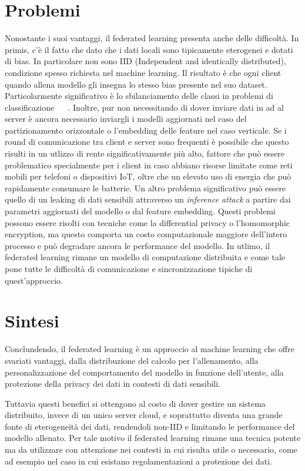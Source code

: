\section{Problemi}
Nonostante i suoi vantaggi, il federated learning presenta anche delle 
difficoltà.
In primis, c'è il fatto che dato che i dati locali sono tipicamente 
eterogenei e dotati di bias. In particolare non sono IID (Independent
and identically distributed), condizione spesso richiesta nel 
machine learning. Il risultato è che ogni client quando allena modello 
gli insegna lo stesso bias presente nel suo dataset. Particolarmente
significativo è lo sbilanciamento delle classi in problemi di 
classificazione ~\cite{zhao2018flniid} ~\cite{xiao2021flci}.
Inoltre, pur non necessitando di dover inviare dati in ad al server è
ancora necessario inviargli i modelli aggiornati nel caso del 
partizionamento orizzontale o l'embedding delle feature nel caso 
verticale. Se i round di comunicazione tra client e server sono 
frequenti è possibile che questo risulti in un utlizzo di rente 
significativamente più alto, fattore che può essere problematico
specialmente per i client in caso abbiano risorse limitate come reti 
mobili per telefoni o dispositivi IoT, oltre che un elevato uso di 
energia che può rapidamente consumare le batterie.
Un altro problema significativo può essere quello di un leaking di 
dati sensibili attraverso un \textit{inference attack} a partire 
dai parametri aggiornati del modello o dal feature embedding. Questi 
problemi possono essere risolti con tecniche come la differential 
privacy o l'homomorphic encryption, ma questo comporta un costo 
computazionale maggiore dell'intero processo e può degradare ancora 
le performance del modello.
In utlimo, il federated learning rimane un modello di computazione 
distribuita e come tale pone tutte le difficoltà di comunicazione e 
sincronizzazione tipiche di quest'approccio.


\section{Sintesi}
Conclundendo, il federated learning è un approccio al machine 
learning che offre svariati vantaggi, dalla distribuzione del 
calcolo per l'allenamento, alla personalizzazione del comportamento 
del modello in funzione dell'utente, alla protezione della 
privacy dei dati in contesti di dati sensibili.

Tuttavia questi benefici si ottengono al costo di dover gestire
un sistema distribuito, invece di un unico server cloud, e 
soprattutto diventa una grande fonte di eterogeneità dei dati,
rendendoli non-IID e limitando le performance del modello 
allenato. Per tale motivo il federated learning rimane una 
tecnica potente ma da utilizzare con attenzione nei contesti 
in cui risulta utile o necessario, come ad esempio nel caso in 
cui esistano regolamentazioni a protezione dei dati.
